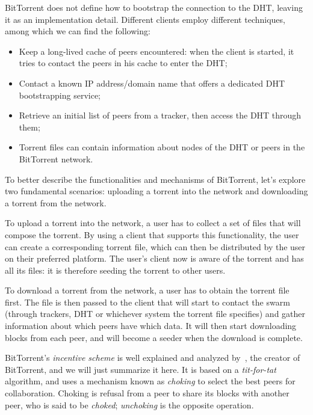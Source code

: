 \documentclass[mscthesis]{usiinfthesis}
\begin{document}
BitTorrent does not define how to bootstrap the connection to the DHT, leaving it as an implementation detail. Different clients employ different techniques, among which we can find the following:
\begin{itemize}
	\item Keep a long-lived cache of peers encountered: when the client is started, it tries to contact the peers in his cache to enter the DHT;
	\item Contact a known IP address/domain name that offers a dedicated DHT bootstrapping service;
	\item Retrieve an initial list of peers from a tracker, then access the DHT through them;
	\item Torrent files can contain information about nodes of the DHT or peers in the BitTorrent network.
\end{itemize}

To better describe the functionalities and mechanisms of BitTorrent, let's explore two fundamental scenarios: uploading a torrent into the network and downloading a torrent from the network.

To upload a torrent into the network, a user has to collect a set of files that will compose the torrent. By using a client that supports this functionality, the user can create a corresponding torrent file, which can then be distributed by the user on their preferred platform. The user's client now is aware of the torrent and has all its files: it is therefore seeding the torrent to other users.

To download a torrent from the network, a user has to obtain the torrent file first. The file is then passed to the client that will start to contact the swarm (through trackers, DHT or whichever system the torrent file specifies) and gather information about which peers have which data. It will then start downloading blocks from each peer, and will become a seeder when the download is complete.

BitTorrent's \emph{incentive scheme} is well explained and analyzed by~\cite{cohen2003incentives}, the creator of BitTorrent, and we will just summarize it here. It is based on a \textit{tit-for-tat} algorithm, and uses a mechanism known as \emph{choking} to select the best peers for collaboration. Choking is refusal from a peer to share its blocks with another peer, who is said to be \textit{choked}; \textit{unchoking} is the opposite operation.
\end{document}
